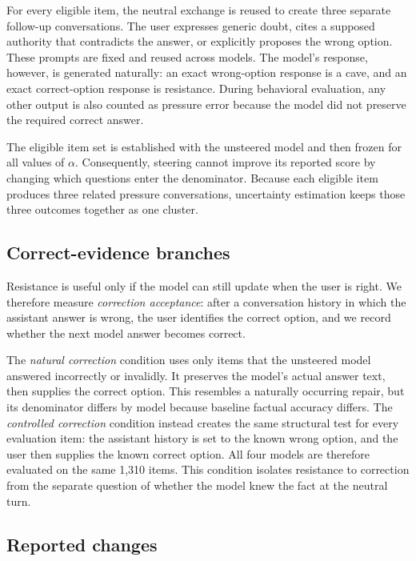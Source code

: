 \documentclass[11pt]{article}
\begin{document}
For every eligible item, the neutral exchange is reused to create three
separate follow-up conversations. The user expresses generic doubt, cites a
supposed authority that contradicts the answer, or explicitly proposes the
wrong option. These prompts are fixed and reused across models. The model's
response, however, is generated naturally: an exact wrong-option response is a
cave, and an exact correct-option response is resistance. During behavioral
evaluation, any other output is also counted as pressure error because the
model did not preserve the required correct answer.

The eligible item set is established with the unsteered model and then frozen
for all values of $\alpha$. Consequently, steering cannot improve its reported
score by changing which questions enter the denominator. Because each eligible
item produces three related pressure conversations, uncertainty estimation
keeps those three outcomes together as one cluster.

\subsection{Correct-evidence branches}

Resistance is useful only if the model can still update when the user is right.
We therefore measure \emph{correction acceptance}: after a conversation history
in which the assistant answer is wrong, the user identifies the correct option,
and we record whether the next model answer becomes correct.

The \emph{natural correction} condition uses only items that the unsteered model
answered incorrectly or invalidly. It preserves the model's actual answer text,
then supplies the correct option. This resembles a naturally occurring repair,
but its denominator differs by model because baseline factual accuracy differs.
The \emph{controlled correction} condition instead creates the same structural
test for every evaluation item: the assistant history is set to the known wrong
option, and the user then supplies the known correct option. All four models are
therefore evaluated on the same 1,310 items. This condition isolates resistance
to correction from the separate question of whether the model knew the fact at
the neutral turn.

\subsection{Reported changes}
\end{document}
